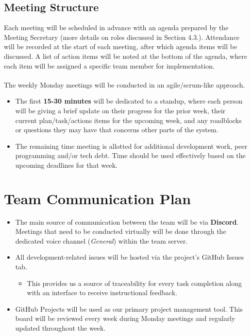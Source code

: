 \documentclass{article}
\begin{document}
\subsection{Meeting Structure}
Each meeting will be scheduled in advance with an agenda prepared by the Meeting
Secretary (more details on roles discussed in Section 4.3.). Attendance will be
recorded at the start of each meeting, after which agenda items will be
discussed. A list of action items will be noted at the bottom of the agenda,
where each item will be assigned a specific team member for implementation. \\
\\
The weekly Monday meetings will be conducted in an agile/scrum-like approach. 
\begin{itemize}
    \item The first \textbf{15-30 minutes} will be dedicated to a standup, where
    each person will be giving a brief update on their progress for the prior
    week, their current plan/task/actions items for the upcoming week, and any
    roadblocks or questions they may have that concerns other parts of the
    system.
    \item The remaining time meeting is allotted for additional development
    work, peer programming and/or tech debt. Time should be used effectively
    based on the upcoming deadlines for that week.
\end{itemize}

\newpage

\section{Team Communication Plan}

\begin{itemize}
    \item The main source of communication between the team will be via
    \textbf{Discord}. Meetings that need to be conducted virtually will be done
    through the dedicated voice channel (\textit{General}) within the team
    server.
    
    \item All development-related issues will be hosted via the project's GitHub
    Issues tab.
    \begin{itemize}
        \item This provides us a source of traceability for every task
        completion along with an interface to receive instructional feedback.
    \end{itemize}

    \item GitHub Projects will be used as our primary project management tool.
    This board will be reviewed every week during Monday meetings and regularly
    updated throughout the week.
\end{itemize}
\end{document}
